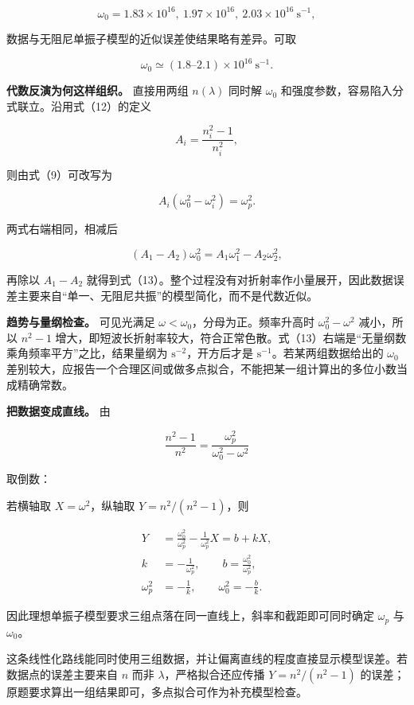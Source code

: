\documentclass[12pt,a4paper,UTF8]{ctexart}
\begin{document}
\[
\omega_0=1.83\times10^{16},
\ 1.97\times10^{16},
\ 2.03\times10^{16}\ \mathrm{s^{-1}},
\]

数据与无阻尼单振子模型的近似误差使结果略有差异。可取

\[
\boxed{\omega_0\simeq(1.8\text{--}2.1)\times10^{16}\ \mathrm{s^{-1}}}. \tag{14}
\]

\textbf{代数反演为何这样组织。} 直接用两组 \(n(\lambda)\) 同时解
\(\omega_0\) 和强度参数，容易陷入分式联立。沿用式（12）的定义

\[
A_i=\frac{n_i^2-1}{n_i^2},
\]

则由式（9）可改写为

\[
A_i(\omega_0^2-\omega_i^2)=\omega_p^2. \tag{15}
\]

两式右端相同，相减后

\[
(A_1-A_2)\omega_0^2
=A_1\omega_1^2-A_2\omega_2^2, \tag{16}
\]

再除以 \(A_1-A_2\)
就得到式（13）。整个过程没有对折射率作小量展开，因此数据误差主要来自``单一、无阻尼共振''的模型简化，而不是代数近似。

\textbf{趋势与量纲检查。} 可见光满足
\(\omega<\omega_0\)，分母为正。频率升高时 \(\omega_0^2-\omega^2\)
减小，所以 \(n^2-1\)
增大，即短波长折射率较大，符合正常色散。式（13）右端是``无量纲数乘角频率平方''之比，结果量纲为
\(\mathrm{s^{-2}}\)，开方后才是 \(\mathrm{s^{-1}}\)。若某两组数据给出的
\(\omega_0\)
差别较大，应报告一个合理区间或做多点拟合，不能把某一组计算出的多位小数当成精确常数。

\textbf{把数据变成直线。} 由

\[
\frac{n^2-1}{n^2}
=\frac{\omega_p^2}{\omega_0^2-\omega^2}
\]

取倒数：

若横轴取 \(X=\omega^2\)，纵轴取 \(Y=n^2/(n^2-1)\)，则

\[
\begin{aligned}
Y
&=\frac{\omega_0^2}{\omega_p^2}
-\frac1{\omega_p^2}X=b+kX,\\
k&=-\frac1{\omega_p^2},
\qquad b=\frac{\omega_0^2}{\omega_p^2},\\
\omega_p^2&=-\frac1k,
\qquad \omega_0^2=-\frac bk.
\end{aligned} \tag{17}
\]

因此理想单振子模型要求三组点落在同一直线上，斜率和截距即可同时确定
\(\omega_p\) 与 \(\omega_0\)。

这条线性化路线能同时使用三组数据，并让偏离直线的程度直接显示模型误差。若数据点的误差主要来自
\(n\) 而非 \(\lambda\)，严格拟合还应传播 \(Y=n^2/(n^2-1)\)
的误差；原题要求算出一组结果即可，多点拟合可作为补充模型检查。
\end{document}
